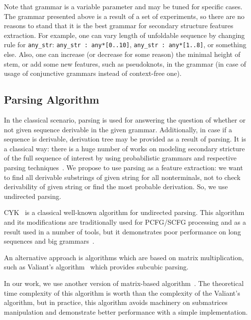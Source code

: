 \documentclass[a4paper,twoside]{article}
\begin{document}
Note that grammar is a variable parameter and may be tuned for specific cases.
The grammar presented above is a result of a set of experiments, so there are no reasons to stand that it is the best grammar for secondary structure features extraction.
For example, one can vary length of unfoldable sequence by changing rule for \verb|any_str|: \verb|any_str : any*[0..10]|, \verb|any_str : any*[1..8]|, or something else.
Also, one can increase (or decrease for some reason) the minimal height of stem, or add some new features, such as pseudoknots, in the grammar (in case of usage of conjunctive grammars instead of context-free one).


\subsection{Parsing Algorithm}

\noindent In the classical scenario, parsing is used for answering the question of whether or not given sequence derivable in the given grammar.
Additionally, in case if a sequence is derivable, derivation tree may be provided as a result of parsing. 
It is a classical way: there is a huge number of works on modeling secondary stricture of the full sequence of interest by using probabilistic grammars and respective parsing techniques~\cite{knudsen2003pfold,Browny1993StochasticCG,Knudsen2005StochasticCG}.
We propose to use parsing as a feature extraction: we want to find all derivable substrings of given string for all nonterminals, not to check derivability of given string or find the most probable derivation.
So, we use undirected parsing.

CYK~\cite{Younger1967RecognitionAP} is a classical well-known algorithm for undirected parsing. 
This algorithm and its modifications are traditionally used for PCFG/SCFG processing and as a result used in a number of tools, but it demonstrates poor performance on long sequences and big grammars~\cite{Liu2005}.

An alternative approach is algorithms which are based on matrix multiplication, such as Valiant's algorithm~\cite{Valiant:1975:GCR:1739932.1740048} which provides subcubic parsing.

In our work, we use another version of matrix-based algorithm~\cite{Azimov:2018:CPQ:3210259.3210264}.
The theoretical time complexity of this algorithm is worth than the complexity of the Valiant's algorithm, but in practice, this algorithm avoids machinery on submatrices manipulation and demonstrate better performance with a simple implementation.
\end{document}
